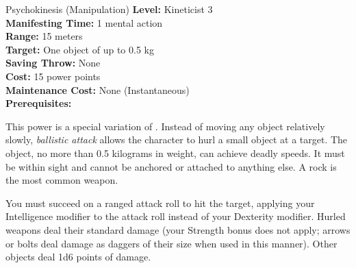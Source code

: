 {Psychokinesis (Manipulation)}
{
	\textbf{Level:}
	Kineticist 3\\
	\textbf{Manifesting Time:}
	1 mental action\\
	\textbf{Range:}
	15 meters\\
	\textbf{Target:}
	One object of up to 0.5 kg\\
	\textbf{Saving Throw:}
	None\\
	\textbf{Cost:}
	15 power points\\
	\textbf{Maintenance Cost:}
	None (Instantaneous)\\
	\textbf{Prerequisites:}
	\\
}
{
	This power is a special variation of . Instead of moving any object relatively slowly, \emph{ballistic attack} allows the character to hurl a small object at a target. The object, no more than 0.5 kilograms in weight, can achieve deadly speeds. It must be within sight and cannot be anchored or attached to anything else. A rock is the most common weapon.

	You must succeed on a ranged attack roll to hit the target, applying your Intelligence modifier to the attack roll instead of your Dexterity modifier. Hurled weapons deal their standard damage (your Strength bonus does not apply; arrows or bolts deal damage as daggers of their size when used in this manner). Other objects deal 1d6 points of damage.
}